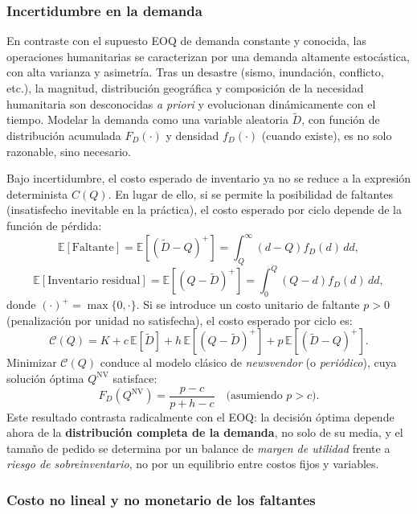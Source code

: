 \documentclass[
  spanish,
  us-letterpaper,
  DIV=11,
  numbers=noendperiod]{scrreprt}
\numberwithin{equation}{section}
\begin{document}
\subsubsection{Incertidumbre en la
demanda}\label{incertidumbre-en-la-demanda}

En contraste con el supuesto EOQ de demanda constante y conocida, las
operaciones humanitarias se caracterizan por una demanda altamente
estocástica, con alta varianza y asimetría. Tras un desastre (sismo,
inundación, conflicto, etc.), la magnitud, distribución geográfica y
composición de la necesidad humanitaria son desconocidas \emph{a priori}
y evolucionan dinámicamente con el tiempo. Modelar la demanda como una
variable aleatoria \(\tilde{D}\), con función de distribución acumulada
\(F_D(\cdot)\) y densidad \(f_D(\cdot)\) (cuando existe), es no solo
razonable, sino necesario.

Bajo incertidumbre, el costo esperado de inventario ya no se reduce a la
expresión determinista \(C(Q)\). En lugar de ello, si se permite la
posibilidad de faltantes (insatisfecho inevitable en la práctica), el
costo esperado por ciclo depende de la función de pérdida: \[
\mathbb{E}[\text{Faltante}] = \mathbb{E}[(\tilde{D} - Q)^+] = \int_Q^\infty (d - Q) f_D(d) \, dd,
\] \[
\mathbb{E}[\text{Inventario residual}] = \mathbb{E}[(Q - \tilde{D})^+] = \int_0^Q (Q - d) f_D(d) \, dd,
\] donde \((\cdot)^+ = \max\{0, \cdot\}\). Si se introduce un costo
unitario de faltante \(p > 0\) (penalización por unidad no satisfecha),
el costo esperado por ciclo es: \[
\mathcal{C}(Q) = K + c \, \mathbb{E}[\tilde{D}] + h \, \mathbb{E}[(Q - \tilde{D})^+] + p \, \mathbb{E}[(\tilde{D} - Q)^+].
\] Minimizar \(\mathcal{C}(Q)\) conduce al modelo clásico de
\emph{newsvendor} (o \emph{periódico}), cuya solución óptima
\(Q^{\text{NV}}\) satisface: \[
F_D(Q^{\text{NV}}) = \frac{p - c}{p + h - c} \quad \text{(asumiendo } p > c\text{)}.
\] Este resultado contrasta radicalmente con el EOQ: la decisión óptima
depende ahora de la \textbf{distribución completa de la demanda}, no
solo de su media, y el tamaño de pedido se determina por un balance de
\emph{margen de utilidad} frente a \emph{riesgo de sobreinventario}, no
por un equilibrio entre costos fijos y variables.

\subsubsection{Costo no lineal y no monetario de los
faltantes}\label{costo-no-lineal-y-no-monetario-de-los-faltantes}
\end{document}

